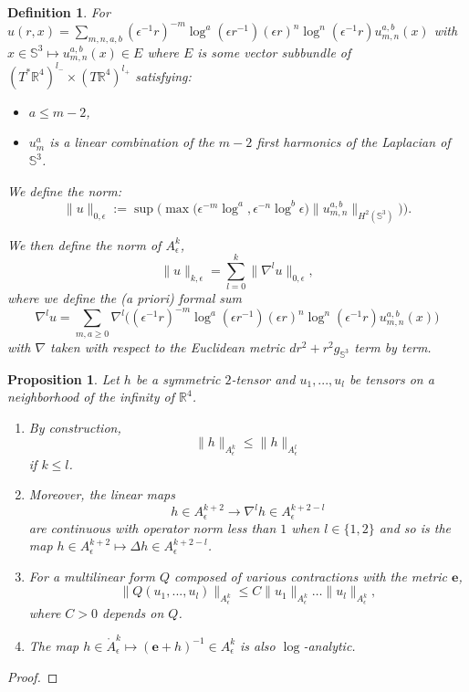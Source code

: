 \documentclass[12pt]{article}
\newtheorem{prop}[thm]{Proposition}
\newtheorem{defn}[thm]{Definition}
\begin{document}
    \begin{defn}
        For $u(r,x) = \sum_{m,n,a,b}(\epsilon^{-1} r)^{-m}\log^a(\epsilon r^{-1})(\epsilon r)^n\log^n(\epsilon^{-1} r) u_{m,n}^{a,b}(x)$ with $x\in \mathbb{S}^3 \mapsto u_{m,n}^{a,b}(x) \in E$ where $E$ is some vector subbundle of $(T^*\mathbb{R}^4)^{l_-}\times (T\mathbb{R}^4)^{l_+}$ satisfying:
        \begin{itemize}
            \item $a\leqslant m-2$,
            \item $u_m^a$ is a linear combination of the $m-2$ first harmonics of the Laplacian of $\mathbb{S}^3$.
        \end{itemize}
        We define the norm:
    $$\|u\|_{0,\epsilon}:= \sup\Big(\max\big( \epsilon^{-m}\log^a,\epsilon^{-n}\log^b\epsilon) \|u_{m,n}^{a,b}\|_{H^2(\mathbb{S}^3)}\big)\Big). $$
        
    We then define the norm of $A^k_\epsilon$, $$\|u\|_{k,\epsilon} = \sum_{l=0}^k \|\nabla^lu\|_{0,\epsilon},$$
    where we define the (a priori) formal sum $$ \nabla^l u  = \sum_{m,a\geqslant 0}\nabla^l \Big((\epsilon^{-1} r)^{-m}\log^a(\epsilon r^{-1})(\epsilon r)^n\log^n(\epsilon^{-1} r) u_{m,n}^{a,b}(x)\Big)$$
    with $\nabla$ taken with respect to the Euclidean metric $dr^2 + r^2g_{\mathbb{S}^3}$ term by term. 
    \end{defn}
   
   
    \begin{prop}\label{properties A epsilon k}
    Let $h$ be a symmetric $2$-tensor and $u_1,...,u_l$ be tensors on a neighborhood of the infinity of $\mathbb{R}^4$. 
    \begin{enumerate}
        \item By construction,
    $$\|h\|_{A_\epsilon^k}\leqslant \|h\|_{A_\epsilon^l}$$
    if $k\leqslant l$. 
    \item Moreover, the linear maps
    $$ h\in A^{k+2}_\epsilon\to \nabla^lh\in A^{k+2-l}_\epsilon $$
    are continuous with operator norm less than $1$ when $l\in \{1,2\}$ and so is the map $ h\in A^{k+2}_\epsilon\mapsto \Delta h \in A^{k+2-l}_\epsilon$. 
    \item For a multilinear form $Q$ composed of various contractions with the metric $\mathbf{e}$,
    $$ \|Q(u_1,...,u_l)\|_{A^{k}_\epsilon} \leqslant C\|u_1\|_{A^{k}_\epsilon}\ldots \|u_l\|_{A^{k}_\epsilon},$$ where $C>0$ depends on $Q$.
    \item The map $h\in \mathring{A}_\epsilon^k\mapsto(\mathbf{e}+h)^{-1}\in A_\epsilon^k$ is also $\log$-analytic. 
    \end{enumerate}
    \end{prop}
    \begin{proof}
    \end{proof}
    
\end{document}
